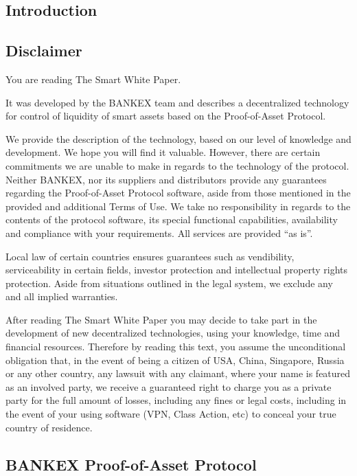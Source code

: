 \documentclass{article}
\begin{document}
\begin{multicols}{2}

\tableofcontents

\section{Introduction}

\subsection{Disclaimer}

You are reading The Smart White Paper.

It was developed by the BANKEX team and describes a decentralized technology for control of liquidity of smart assets based on the Proof-of-Asset Protocol.
	
We provide the description of the technology, based on our level of knowledge and development. We hope you will find it valuable. However, there are certain commitments we are unable to make in regards to the technology of the protocol.  
Neither BANKEX, nor its suppliers and distributors provide any guarantees regarding the Proof-of-Asset Protocol software, aside from those mentioned in the provided and additional Terms of Use. We take no responsibility in regards to the contents of the protocol software, its special functional capabilities, availability and compliance with your requirements. All services are provided \enquote{as is}.

Local law of certain countries ensures guarantees such as vendibility, serviceability in certain fields, investor protection and intellectual property rights protection. Aside from situations outlined in the legal system, we exclude any and all implied warranties.

After reading The Smart White Paper you may decide to take part in the development of new decentralized technologies, using your knowledge, time and financial resources. Therefore by reading this text, you assume the unconditional obligation that, in the event of being a citizen of USA, China, Singapore, Russia or any other country, any lawsuit with any claimant, where your name is featured as an involved party, we receive a guaranteed right to charge you as a private party for the full amount of losses, including any fines or legal costs, including in the event of your using software (VPN, Class Action, etc) to conceal your true country of residence. 

\subsection{BANKEX Proof-of-Asset Protocol}


\end{multicols}
\end{document}
